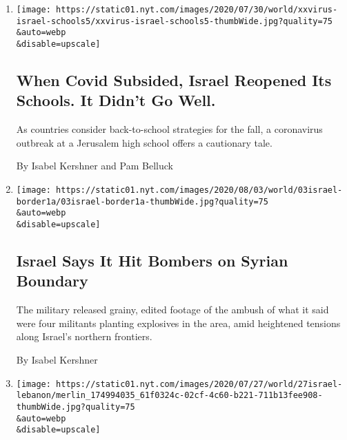\begin{enumerate}
\def\labelenumi{\arabic{enumi}.}
\item
  \href{/2020/08/04/world/middleeast/coronavirus-israel-schools-reopen.html}{}

  \texttt{[image: https://static01.nyt.com/images/2020/07/30/world/xxvirus-israel-schools5/xxvirus-israel-schools5-thumbWide.jpg?quality=75\\\&auto=webp\\\&disable=upscale]}

  \hypertarget{when-covid-subsided-israel-reopened-its-schools-it-didnt-go-well}{%
  \subsection{When Covid Subsided, Israel Reopened Its Schools. It
  Didn't Go
  Well.}\label{when-covid-subsided-israel-reopened-its-schools-it-didnt-go-well}}

  As countries consider back-to-school strategies for the fall, a
  coronavirus outbreak at a Jerusalem high school offers a cautionary
  tale.

  By Isabel Kershner and Pam Belluck
\item
  \href{/2020/08/03/world/middleeast/israel-syria-border.html}{}

  \texttt{[image: https://static01.nyt.com/images/2020/08/03/world/03israel-border1a/03israel-border1a-thumbWide.jpg?quality=75\\\&auto=webp\\\&disable=upscale]}

  \hypertarget{israel-says-it-hit-bombers-on-syrian-boundary}{%
  \subsection{Israel Says It Hit Bombers on Syrian
  Boundary}\label{israel-says-it-hit-bombers-on-syrian-boundary}}

  The military released grainy, edited footage of the ambush of what it
  said were four militants planting explosives in the area, amid
  heightened tensions along Israel's northern frontiers.

  By Isabel Kershner
\item
  \href{/2020/07/27/world/middleeast/israel-hezbollah-lebanon-fighting.html}{}

  \texttt{[image: https://static01.nyt.com/images/2020/07/27/world/27israel-lebanon/merlin\_174994035\_61f0324c-02cf-4c60-b221-711b13fee908-thumbWide.jpg?quality=75\\\&auto=webp\\\&disable=upscale]}

  \hypertarget{israel-says-it-thwarted-a-hezbollah-raid-at-lebanon-border}{%
}
\end{enumerate}
